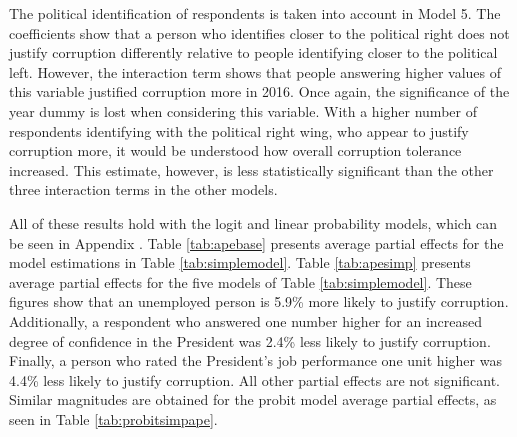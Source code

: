 \documentclass[12pt,a4]{article}
\begin{document}
The political identification of respondents is taken into account in Model 5. The coefficients show that a person who identifies closer to the political right does not justify corruption differently relative to people identifying closer to the political left. However, the interaction term shows that people answering higher values of this variable justified corruption more in 2016. Once again, the significance of the year dummy is lost when considering this variable. With a higher number of respondents identifying with the political right wing, who appear to justify corruption more, it would be understood how overall corruption tolerance increased. This estimate, however, is less statistically significant than the other three interaction terms in the other models. 

All of these results hold with the logit and linear probability models, which can be seen in Appendix \label{app:second}. Table \ref{tab:apebase} presents average partial effects for the model estimations in Table \ref{tab:simplemodel}. Table \ref{tab:apesimp} presents average partial effects for the five models of Table \ref{tab:simplemodel}. These figures show that an unemployed person is 5.9\% more likely to justify corruption. Additionally, a respondent who answered one number higher for an increased degree of confidence in the President was 2.4\% less likely to justify corruption. Finally, a person who rated the President's job performance one unit higher was 4.4\% less likely to justify corruption. All other partial effects are not significant. Similar magnitudes are obtained for the probit model average partial effects, as seen in Table \ref{tab:probitsimpape}. 
\end{document}
